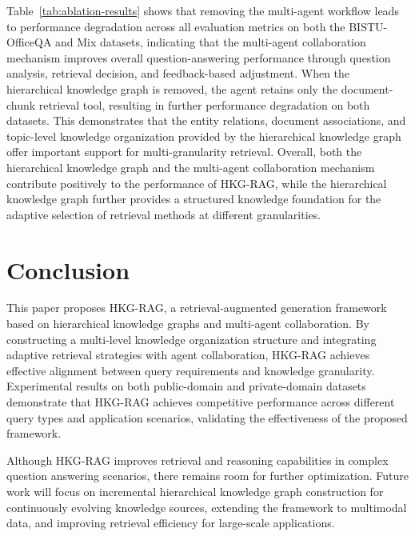 \documentclass[preprint,12pt,authoryear]{elsarticle}
\begin{document}
Table~\ref{tab:ablation-results} shows that removing the multi-agent workflow leads to performance degradation across all evaluation metrics on both the BISTU-OfficeQA and Mix datasets, indicating that the multi-agent collaboration mechanism improves overall question-answering performance through question analysis, retrieval decision, and feedback-based adjustment. When the hierarchical knowledge graph is removed, the agent retains only the document-chunk retrieval tool, resulting in further performance degradation on both datasets. This demonstrates that the entity relations, document associations, and topic-level knowledge organization provided by the hierarchical knowledge graph offer important support for multi-granularity retrieval. Overall, both the hierarchical knowledge graph and the multi-agent collaboration mechanism contribute positively to the performance of HKG-RAG, while the hierarchical knowledge graph further provides a structured knowledge foundation for the adaptive selection of retrieval methods at different granularities.

\section{Conclusion}
\label{sec:conclusion}
This paper proposes HKG-RAG, a retrieval-augmented generation framework based on hierarchical knowledge graphs and multi-agent collaboration. By constructing a multi-level knowledge organization structure and integrating adaptive retrieval strategies with agent collaboration, HKG-RAG achieves effective alignment between query requirements and knowledge granularity. Experimental results on both public-domain and private-domain datasets demonstrate that HKG-RAG achieves competitive performance across different query types and application scenarios, validating the effectiveness of the proposed framework.

Although HKG-RAG improves retrieval and reasoning capabilities in complex question answering scenarios, there remains room for further optimization. Future work will focus on incremental hierarchical knowledge graph construction for continuously evolving knowledge sources, extending the framework to multimodal data, and improving retrieval efficiency for large-scale applications.


\end{document}

